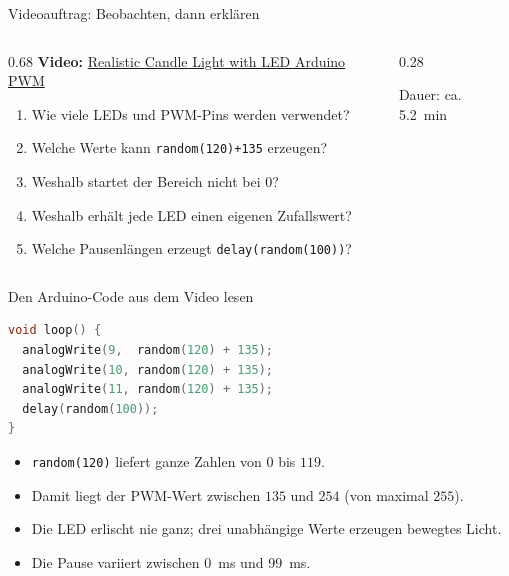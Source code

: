 \begin{frame}{Videoauftrag: Beobachten, dann erklären}
	\begin{columns}[T]
		\begin{column}{0.68\textwidth}
			\textbf{Video:} \href{https://www.youtube.com/watch?v=uX9YMCLgK9A}{Realistic Candle Light with LED Arduino PWM}
			\begin{enumerate}
				\item Wie viele LEDs und PWM-Pins werden verwendet?
				\item Welche Werte kann \lstinline|random(120)+135| erzeugen?
				\item Weshalb startet der Bereich nicht bei $0$?
				\item Weshalb erhält jede LED einen eigenen Zufallswert?
				\item Welche Pausenlängen erzeugt \lstinline|delay(random(100))|?
			\end{enumerate}
		\end{column}
		\begin{column}{0.28\textwidth}
			\centering

			\vspace{.3cm}
			\scriptsize Dauer: ca. \qty{5.2}{\minute}
		\end{column}
	\end{columns}
\end{frame}

\begin{frame}[fragile]{Den Arduino-Code aus dem Video lesen}
\begin{lstlisting}[language=C++]
void loop() {
  analogWrite(9,  random(120) + 135);
  analogWrite(10, random(120) + 135);
  analogWrite(11, random(120) + 135);
  delay(random(100));
}
\end{lstlisting}
	\begin{itemize}
		\item \lstinline|random(120)| liefert ganze Zahlen von $0$ bis $119$.
		\item Damit liegt der PWM-Wert zwischen $135$ und $254$ (von maximal $255$).
		\item Die LED erlischt nie ganz; drei unabhängige Werte erzeugen bewegtes Licht.
		\item Die Pause variiert zwischen \qty{0}{\milli\second} und \qty{99}{\milli\second}.
	\end{itemize}
\end{frame}

